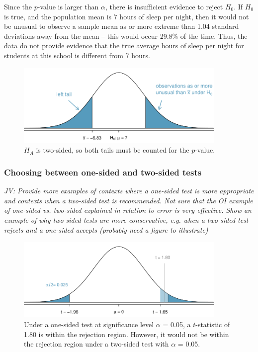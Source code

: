\begin{spacing}{1.5}
\begin{example}
	Since the $p$-value is larger than $\alpha$, there is insufficient evidence to reject $H_0$. If $H_0$ is true, and the population mean is 7 hours of sleep per night, then it would not be unusual to observe a sample mean as or more extreme than 1.04 standard deviations away from the mean -- this would occur 29.8\% of the time. Thus, the data do not provide evidence that the true average hours of sleep per night for students at this school is different from 7 hours.
\end{example}
	
\begin{figure}[h]
	\centering
	\includegraphics[width=0.9\textwidth]
	{ch_inference_foundations_oi_biostat/figures/2ndSchSleepHTExample/2ndSchSleepHTExample}
	\caption{$H_A$ is two-sided, so both tails must be counted for the $p$-value.}
	\label{2ndSchSleepHTExample}
\end{figure}	
	

\subsubsection{Choosing between one-sided and two-sided tests}

\textit{JV: Provide more examples of contexts where a one-sided test is more appropriate and contexts when a two-sided test is recommended. Not sure that the OI example of one-sided vs. two-sided explained in relation to error is very effective. Show an example of why two-sided tests are more conservative, e.g. when a two-sided test rejects and a one-sided accepts (probably need a figure to illustrate)}

\begin{figure}[h]
	\centering
	\includegraphics[width=0.9\textwidth]
	{ch_inference_foundations_oi_biostat/figures/twoSidedTestConservative/twoSidedTestConservative}
	\caption{Under a one-sided test at significance level $\alpha$ = 0.05, a $t$-statistic of 1.80 is within the rejection region. However, it would not be within the rejection region under a two-sided test with $\alpha$ = 0.05.}
	\label{twoSidedTestConservative}
\end{figure}


\end{spacing}
